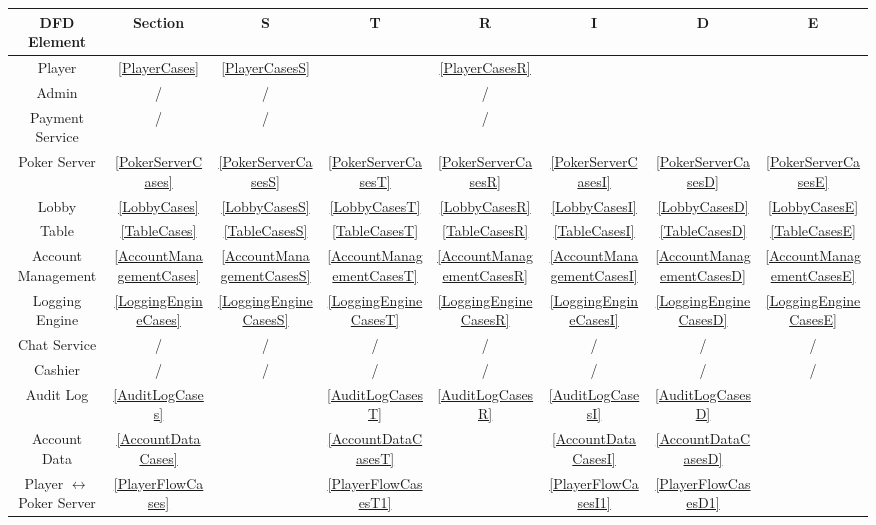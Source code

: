 \documentclass[a4paper,11pt]{report}
\begin{document}
\vspace{0.3cm}
\begin{center}
\begin{tabular}{| c || c || c | c | c | c | c | c |}
  \hline
  \textbf{DFD Element} 	& \textbf{Section}		& \textbf{S} 	& \textbf{T} 	& \textbf{R} 	& \textbf{I} 	& \textbf{D} 	& \textbf{E}	\\\hline
  \hline
  Player 		& \ref{PlayerCases}		& \ref{PlayerCasesS} 	& 	& \ref{PlayerCasesR} 		&  		&  		& 		\\\hline
  Admin 		& /			& / 		& 		& / 		&  		&  		& 		\\\hline
  Payment Service 	& /			& / 		& 		& / 		&  		&  		& 		\\\hline
  \hline
  Poker Server 		& \ref{PokerServerCases}	& \ref{PokerServerCasesS} 	& \ref{PokerServerCasesT}	& \ref{PokerServerCasesR} 	& \ref{PokerServerCasesI} 	& \ref{PokerServerCasesD} 	& \ref{PokerServerCasesE}	\\\hline
  Lobby 		& \ref{LobbyCases}		& \ref{LobbyCasesS} 	& \ref{LobbyCasesT}	& \ref{LobbyCasesR} 	& \ref{LobbyCasesI} 	& \ref{LobbyCasesD} 	& \ref{LobbyCasesE}	\\\hline
  Table 		& \ref{TableCases}		& \ref{TableCasesS} 	& \ref{TableCasesT}	& \ref{TableCasesR} 	& \ref{TableCasesI} 	& \ref{TableCasesD} 	& \ref{TableCasesE}	\\\hline
  Account Management 	& \ref{AccountManagementCases} 	& \ref{AccountManagementCasesS} 	& \ref{AccountManagementCasesT}	& \ref{AccountManagementCasesR} 	& \ref{AccountManagementCasesI} 	& \ref{AccountManagementCasesD} 	& \ref{AccountManagementCasesE}	\\\hline
  Logging Engine 	& \ref{LoggingEngineCases}	& \ref{LoggingEngineCasesS} 	& \ref{LoggingEngineCasesT}	& \ref{LoggingEngineCasesR} 	& \ref{LoggingEngineCasesI} 	& \ref{LoggingEngineCasesD} 	& \ref{LoggingEngineCasesE}	\\\hline
  Chat Service 		& /			& / 	& /	& / 	& / 	& / 	& /	\\\hline
  Cashier 		& /			& / 	& /	& / 	& / 	& / 	& /	\\\hline
  \hline
  Audit Log 		& \ref{AuditLogCases}		& 	& \ref{AuditLogCasesT}	& \ref{AuditLogCasesR} 	& \ref{AuditLogCasesI} 	& \ref{AuditLogCasesD}	& 	\\\hline
  Account Data 		& \ref{AccountDataCases}	& 	& \ref{AccountDataCasesT}	&  	& \ref{AccountDataCasesI} 	& \ref{AccountDataCasesD}	& 	\\\hline
  \hline
  Player $\leftrightarrow$
  Poker Server 		& \ref{PlayerFlowCases}		&	& \ref{PlayerFlowCasesT1}	&	& \ref{PlayerFlowCasesI1}	& \ref{PlayerFlowCasesD1}	&\\

\end{tabular}
\end{center}
\end{document}
